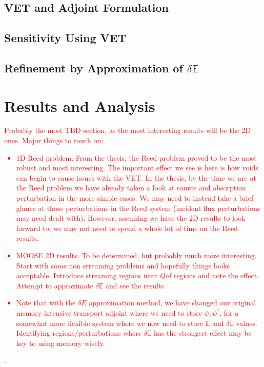 \documentclass[review]{elsarticle}
\newcommand{\Edd}{\mathbb{E}}
\newcommand{\qoi}{{\it QoI}\xspace}
\newcommand{\comment}[2]{\marginpar{\textcolor{#2}{$\star$}}\textcolor{#2}{#1}\newline}
\newcommand{\iwh}[1]{\comment{#1}{red}}
\newcommand{\iwh}[1]{\phantom{a}}
\begin{document}
\subsection{VET and Adjoint Formulation}

\subsection{Sensitivity Using VET}

\subsection{Refinement by Approximation of $\delta \Edd$}

\section{Results and Analysis}
\label{sec:RnA}
\iwh{Probably the most TBD section, as the most interesting results will be the 2D ones. Major things to touch on:
\begin{itemize}
\item 1D Reed problem. From the thesis, the Reed problem proved to be the most robust and most interesting. The important effect we see is here is how voids can begin to cause issues with the VET. In the thesis, by the time we are at the Reed problem we have already taken a look at source and absorption perturbation in the more simple cases. We may need to instead take a brief glance at those perturbations in the Reed system (incident flux perturbations may need dealt with). However, assuming we have the 2D results to look forward to, we may not need to spend a whole lot of time on the Reed results. 
\item MOOSE 2D results. To be determined, but probably much more interesting. Start with some non streaming problems and hopefully things looks acceptable. Introduce streaming regions near \qoi regions and note the effect. Attempt to approximate $\delta \Edd$ and see the results. 
\item Note that with the $\delta E$ approximation method, we have changed our original memory intensive transport adjoint where we need to store $\psi,\psi^\dag$, for a somewhat more flexible system where we now need to store $\Edd$ and $\delta \Edd$ values. Identifying regions/perturbations where $\delta \Edd$ has the strongest effect may be key to using memory wisely.
\end{itemize}
.}
\end{document}
